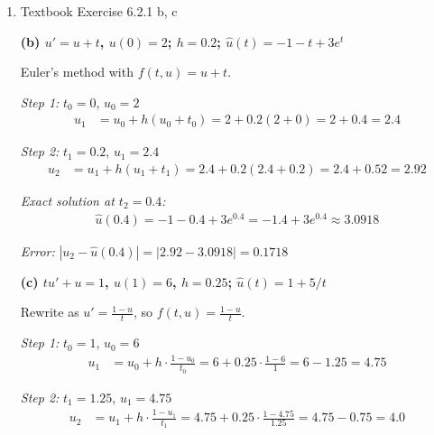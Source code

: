 \documentclass[reqno]{exam}
\begin{document}
\begin{enumerate}
\begin{solution}
          \textbf{Conclusion:} No, the solution does NOT necessarily exist for all $t \in [0,1]$. It exists on $[0,1]$ if and only if $\alpha < 1$.

        \end{solution}
  \item Textbook Exercise 6.2.1 b, c
        \begin{solution}

          \textbf{(b) $u' = u + t$, $u(0) = 2$; $h = 0.2$; $\hat{u}(t) = -1 - t + 3e^t$}

          Euler's method with $f(t,u) = u + t$.

          \textit{Step 1:} $t_0 = 0$, $u_0 = 2$
          \begin{align*}
            u_1 & = u_0 + h(u_0 + t_0) = 2 + 0.2(2 + 0) = 2 + 0.4 = 2.4
          \end{align*}

          \textit{Step 2:} $t_1 = 0.2$, $u_1 = 2.4$
          \begin{align*}
            u_2 & = u_1 + h(u_1 + t_1) = 2.4 + 0.2(2.4 + 0.2) = 2.4 + 0.52 = 2.92
          \end{align*}

          \textit{Exact solution at $t_2 = 0.4$:}
          \begin{align*}
            \hat{u}(0.4) = -1 - 0.4 + 3e^{0.4} = -1.4 + 3e^{0.4} \approx 3.0918
          \end{align*}

          \textit{Error:} $|u_2 - \hat{u}(0.4)| = |2.92 - 3.0918| = 0.1718$

          \medskip

          \textbf{(c) $tu' + u = 1$, $u(1) = 6$, $h = 0.25$; $\hat{u}(t) = 1 + 5/t$}

          Rewrite as $u' = \frac{1-u}{t}$, so $f(t,u) = \frac{1-u}{t}$.

          \textit{Step 1:} $t_0 = 1$, $u_0 = 6$
          \begin{align*}
            u_1 & = u_0 + h \cdot \frac{1-u_0}{t_0} = 6 + 0.25 \cdot \frac{1-6}{1} = 6 - 1.25 = 4.75
          \end{align*}

          \textit{Step 2:} $t_1 = 1.25$, $u_1 = 4.75$
          \begin{align*}
            u_2 & = u_1 + h \cdot \frac{1-u_1}{t_1} = 4.75 + 0.25 \cdot \frac{1-4.75}{1.25} = 4.75 - 0.75 = 4.0
          \end{align*}


\end{solution}
\end{enumerate}
\end{document}
